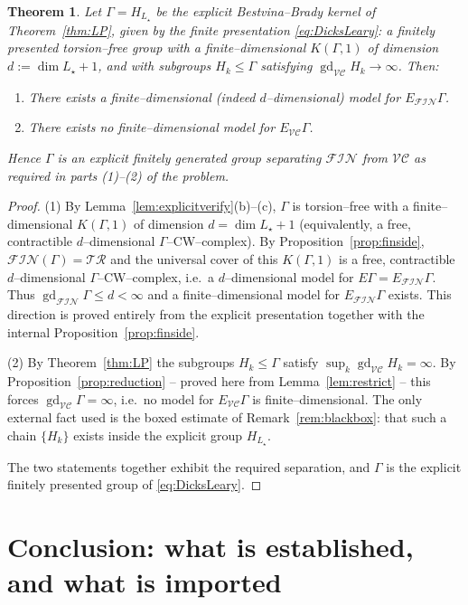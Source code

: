 \documentclass{amsart}
\newtheorem{theorem}{Theorem}
\theoremstyle{definition}
\newcommand{\FIN}{\mathcal{F\!I\!N}}
\newcommand{\VC}{\mathcal{V\!C}}
\newcommand{\gd}{\operatorname{gd}}
\begin{document}
\begin{theorem}\label{thm:main}
Let $\Gamma=H_{L_\star}$ be the explicit Bestvina--Brady kernel of Theorem~\ref{thm:LP}, given
by the finite presentation \eqref{eq:DicksLeary}: a finitely presented torsion--free group with
a finite--dimensional $K(\Gamma,1)$ of dimension $d:=\dim L_\star+1$, and with subgroups
$H_k\le\Gamma$
satisfying $\gd_{\VC}H_k\to\infty$. Then:
\begin{enumerate}
\item There exists a finite--dimensional (indeed $d$--dimensional) model for $E_{\FIN}\Gamma$.
\item There exists no finite--dimensional model for $E_{\VC}\Gamma$.
\end{enumerate}
Hence $\Gamma$ is an explicit finitely generated group separating $\FIN$ from $\VC$ as
required in parts (1)--(2) of the problem.
\end{theorem}

\begin{proof}
(1) By Lemma~\ref{lem:explicitverify}(b)--(c), $\Gamma$ is torsion--free with a
finite--dimensional $K(\Gamma,1)$ of dimension $d=\dim L_\star+1$ (equivalently, a free,
contractible $d$--dimensional $\Gamma$--CW--complex). By Proposition~\ref{prop:finside},
$\FIN(\Gamma)=\mathcal{TR}$ and the universal cover of this $K(\Gamma,1)$ is a free,
contractible $d$--dimensional $\Gamma$--CW--complex, i.e.\ a $d$--dimensional model for
$E\Gamma=E_{\FIN}\Gamma$. Thus $\gd_{\FIN}\Gamma\le d<\infty$ and a finite--dimensional model
for $E_{\FIN}\Gamma$ exists. This direction is proved entirely from the explicit presentation
together with the internal Proposition~\ref{prop:finside}.

(2) By Theorem~\ref{thm:LP} the subgroups $H_k\le\Gamma$ satisfy $\sup_k\gd_{\VC}H_k=\infty$.
By Proposition~\ref{prop:reduction} -- proved here from Lemma~\ref{lem:restrict} -- this forces
$\gd_{\VC}\Gamma=\infty$, i.e.\ no model for $E_{\VC}\Gamma$ is finite--dimensional. The only
external fact used is the boxed estimate of Remark~\ref{rem:blackbox}: that such a chain
$\{H_k\}$ exists inside the explicit group $H_{L_\star}$.

The two statements together exhibit the required separation, and $\Gamma$ is the explicit
finitely presented group of \eqref{eq:DicksLeary}.
\end{proof}

\section{Conclusion: what is established, and what is imported}
\end{document}
